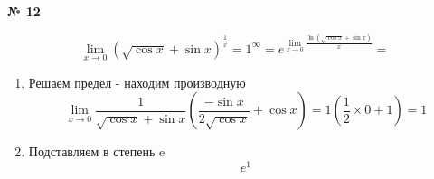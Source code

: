 \documentclass{article}
\begin{document}
\textbf{№ 12} 

\begingroup
\Large

$$ \lim\limits_{x\to 0} \left( \sqrt{\cos{x}} + \sin{x} \right)^{\frac{1}{x}}
= 1^{\infty}
= e^{\lim\limits_{x\to 0} \frac{\ln {(\sqrt{\cos{x}} + \sin{x})}}{x} }
= $$

\begin{enumerate}
\item Решаем предел - находим производную
$$ \lim\limits_{x\to 0} \frac{1}{\sqrt{\cos{x}} + \sin{x}} \left( \frac{-\sin{x}}{2\sqrt{\cos{x}}} + \cos{x} \right)
= 1 \left(\frac{1}{2} \times 0 + 1 \right)
= 1$$

\item Подставляем в степень e
$$e^{1}$$

\end{enumerate}
\endgroup
\end{document}
